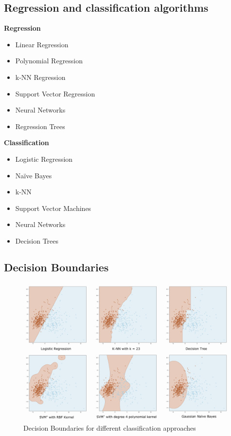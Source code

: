 \documentclass[a4paper, 11pt]{article}
\begin{document}
\subsection{Regression and classification algorithms}

\begin{multicols}{2}
    \textbf{Regression}
    \begin{itemize}
        \item Linear Regression
        \item Polynomial Regression
        \item k-NN Regression
        \item Support Vector Regression
        \item Neural Networks
        \item Regression Trees
    \end{itemize}
    \columnbreak
    \textbf{Classification}
    \begin{itemize}
        \item Logistic Regression
        \item Naïve Bayes
        \item k-NN
        \item Support Vector Machines
        \item Neural Networks
        \item Decision Trees
    \end{itemize}
\end{multicols}

\subsection{Decision Boundaries}

\begin{figure}[htb!]
    \centering
    \includegraphics[keepaspectratio=true, width=\linewidth]{decision_boundaries.png}
    \caption{Decision Boundaries for different classification approaches}
    \label{fig:decision_boundaries}
\end{figure}
\end{document}

